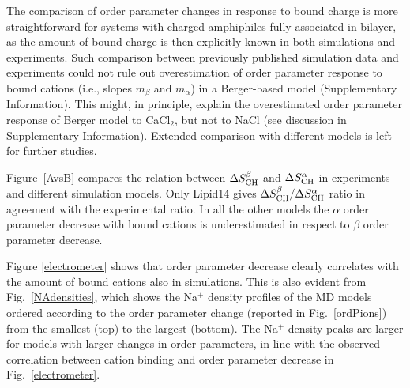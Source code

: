 \documentclass[pre,aps,floatfix,authordate1-4,twocolumn]{revtex4-1}
\begin{document}
The comparison of order parameter changes in response to bound charge is more straightforward for
systems with charged amphiphiles fully associated in bilayer, as the amount of bound charge
is then explicitly known in both simulations and experiments. Such comparison
between previously published simulation data \cite{miettinen09} and experiments \cite{scherer89,franzin98}
could not rule out
overestimation of order parameter response to bound cations (i.e., slopes $m_\beta$ and $m_\alpha$)
in a Berger-based model (Supplementary Information).
This might, in principle, explain the overestimated order parameter 
response of Berger model to CaCl$_2$, but not to NaCl (see discussion in Supplementary Information).
Extended comparison with different models is left for further studies.





Figure~\ref{AvsB} compares the relation between $\Delta S_{\rm{CH}}^{\beta}$ and $\Delta S_{\rm{CH}}^{\alpha}$
in experiments~\cite{akutsu81} and different simulation models.
Only Lipid14 gives $\Delta S_{\rm{CH}}^{\beta}/\Delta S_{\rm{CH}}^{\alpha}$ ratio in agreement with the experimental ratio.
In all the other models the $\alpha$ order parameter decrease with bound cations is underestimated in
respect to $\beta$ order parameter decrease.

Figure \ref{electrometer} shows that order parameter decrease clearly correlates with the
amount of bound cations also in simulations. This is also evident from Fig.~\ref{NAdensities},
which shows the Na$^+$ density profiles of the MD models
ordered according to the order parameter change 
(reported in Fig.~\ref{ordPions}) from the smallest (top) to the largest (bottom).
The Na$^+$ density peaks are larger for models with larger changes in order parameters,
in line with the observed correlation between cation binding and order parameter decrease in
Fig.~\ref{electrometer}.
\end{document}

